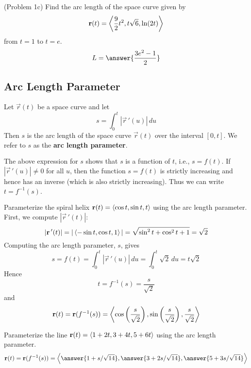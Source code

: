 \documentclass[handout]{ximera}
\begin{document}
\begin{problem}(Problem 1c)
Find the arc length of the space curve given by
\[
\mathbf r(t) = \left\langle \frac92 t^2, t\sqrt 6, \ln(2t)\right\rangle
\]
from $ t= 1$ to $t = e$.
\[
L = \answer{\frac{3e^2 -1}{2}}
\]
\end{problem}




\subsection{Arc Length Parameter}

Let $\vec r(t) $ be a space curve and let 
\[
s = \int_0^t |\vec r\,'(u)| \, du
\]
Then $s$ is the arc length of the space curve $\vec r(t)$ over the interval $[0, t]$.
We refer to $s$ as the \textbf{arc length parameter}.

The above expression for $s$ shows that $s$ is a function of $t$, i.e., $s = f(t)$.
If $|\vec r\,'(u)| \neq 0$ for all $u$, then the function $s = f(t)$ is strictly increasing and hence has an inverse (which is also strictly increasing).
Thus we can write $t = f^{-1}(s)$.

\begin{example}[Example 2]
Parameterize the spiral helix $\mathbf r(t) = \left\langle \cos t, \sin t, t\right\rangle$ using the arc length parameter.\\
First, we compute $|\vec r\,'(t)|$:
\[
|\mathbf r\,'(t)| = |\left\langle -\sin t, \cos t, 1\right\rangle| = \sqrt{\sin^2 t + \cos^2 t + 1} = \sqrt 2
\]
Computing the arc length parameter, $s$, gives
\[
s = f(t) = \int_0^t |\vec r\,'(u)| \, du = \int_0^t \sqrt 2 \, du = t \sqrt 2
\]
Hence
\[
t = f^{-1}(s) = \frac{s}{\sqrt 2}
\]
and 
\[
\mathbf r(t) = \mathbf r(f^{-1}(s)) = \left\langle \cos \left(\frac{s}{\sqrt 2}\right), \sin \left(\frac{s}{\sqrt 2}\right),\frac{s}{\sqrt 2}\right\rangle
\]
\end{example}


\begin{problem}[Problem 2]
Parameterize the line $\mathbf r(t) =\left\langle 1+2t, 3+4t, 5+6t\right\rangle$ using the arc length parameter.
\[
\vec r(t) = \vec r(f^{-1}(s)) = \vector{\answer{1 + s/\sqrt{14}}, \answer{3 + 2s/\sqrt{14}}, \answer{5 + 3s/\sqrt{14}}}
\]
\end{problem}
\end{document}
